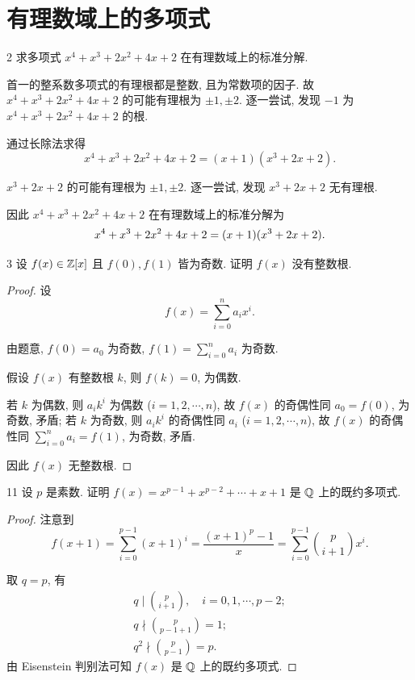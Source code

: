 
\renewcommand{\thesection}{1.8}

\section{有理数域上的多项式}\label{sec:1.8}

\begin{ex}{2}\label{ex:1.8.2}
    求多项式 \(x^4+x^3+2x^2+4x+2\) 在有理数域上的标准分解.
\end{ex}

\begin{solution}
    首一的整系数多项式的有理根都是整数, 且为常数项的因子.
    故 \(x^4+x^3+2x^2+4x+2\) 的可能有理根为 \(\pm1,\pm2\).
    逐一尝试, 发现 \(-1\) 为 \(x^4+x^3+2x^2+4x+2\) 的根.
    
    通过长除法求得
    \[
    x^4+x^3+2x^2+4x+2=(x+1)(x^3+2x+2).
    \]

    \(x^3+2x+2\) 的可能有理根为 \(\pm1,\pm2\). 逐一尝试, 发现 \(x^3+2x+2\) 无有理根.

    因此 \(x^4+x^3+2x^2+4x+2\) 在有理数域上的标准分解为
    \[
    x^4+x^3+2x^2+4x+2=(x+1)(x^3+2x+2).\qedhere
    \]
\end{solution}

\begin{ex}{3}\label{ex:1.8.3}
    设 \(f(x)\in\mathbb{Z}[x]\) 且 \(f(0),f(1)\) 皆为奇数. 证明 \(f(x)\) 没有整数根.
\end{ex}

\begin{proof}
    设
    \[
    f(x)=\sum_{i=0}^na_ix^i.
    \]

    由题意, \(f(0)=a_0\) 为奇数, \(\displaystyle f(1)=\sum_{i=0}^na_i\) 为奇数.

    假设 \(f(x)\) 有整数根 \(k\), 则 \(f(k)=0\), 为偶数.

    若 \(k\) 为偶数, 则 \(a_ik^i\) 为偶数 (\(i=1,2,\cdots,n\)),
    故 \(f(x)\) 的奇偶性同 \(a_0=f(0)\), 为奇数, 矛盾;
    若 \(k\) 为奇数, 则 \(a_ik^i\) 的奇偶性同 \(a_i\) (\(i=1,2,\cdots,n\)),
    故 \(f(x)\) 的奇偶性同 \(\displaystyle\sum_{i=0}^na_i=f(1)\), 为奇数, 矛盾.

    因此 \(f(x)\) 无整数根.
\end{proof}

\begin{ex}{11}\label{ex:1.8.11}
    设 \(p\) 是素数. 证明 \(f(x)=x^{p-1}+x^{p-2}+\cdots+x+1\) 是 \(\mathbb{Q}\) 上的既约多项式.
\end{ex}

\begin{proof}
    注意到
    \[
    f(x+1)=\sum_{i=0}^{p-1}(x+1)^i=\frac{(x+1)^p-1}{x}=\sum_{i=0}^{p-1}\binom{p}{i+1}x^i.
    \]

    取 \(q=p\), 有
    \begin{gather*}
        q\mid\binom{p}{i+1},\quad i=0,1,\cdots,p-2;\\
        q\nmid\binom{p}{p-1+1}=1;\\
        q^2\nmid\binom{p}{p-1}=p.
    \end{gather*}
    由 Eisenstein 判别法可知 \(f(x)\) 是 \(\mathbb{Q}\) 上的既约多项式.
\end{proof}